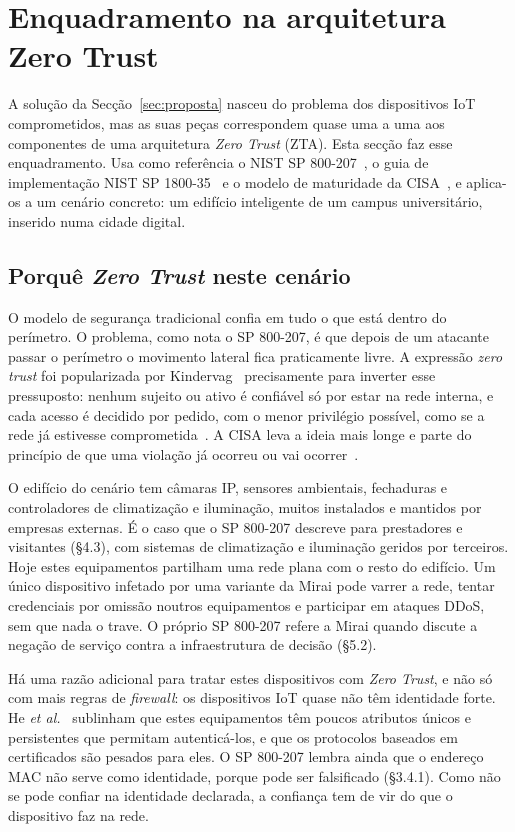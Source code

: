 \documentclass[conference,a4paper]{IEEEtran}
\begin{document}
\section{Enquadramento na arquitetura Zero Trust}\label{sec:zta}
A solução da Secção~\ref{sec:proposta} nasceu do problema dos dispositivos IoT
comprometidos, mas as suas peças correspondem quase uma a uma aos componentes de uma
arquitetura \textit{Zero Trust} (ZTA). Esta secção faz esse enquadramento. Usa como
referência o NIST SP 800-207~\cite{rose2020zta}, o guia de implementação NIST SP
1800-35~\cite{nccoe2025zta} e o modelo de maturidade da CISA~\cite{cisa2023ztmm}, e
aplica-os a um cenário concreto: um edifício inteligente de um campus universitário,
inserido numa cidade digital.

\subsection{Porquê \textit{Zero Trust} neste cenário}
O modelo de segurança tradicional confia em tudo o que está dentro do perímetro. O
problema, como nota o SP 800-207, é que depois de um atacante passar o perímetro o
movimento lateral fica praticamente livre. A expressão \textit{zero trust} foi
popularizada por Kindervag~\cite{kindervag2010zero} precisamente para inverter esse
pressuposto: nenhum sujeito ou ativo é confiável só por estar na rede interna, e cada
acesso é decidido por pedido, com o menor privilégio possível, como se a rede já
estivesse comprometida~\cite{rose2020zta}. A CISA leva a ideia mais longe e parte do
princípio de que uma violação já ocorreu ou vai ocorrer~\cite{cisa2023ztmm}.

O edifício do cenário tem câmaras IP, sensores ambientais, fechaduras e controladores
de climatização e iluminação, muitos instalados e mantidos por empresas externas. É o
caso que o SP 800-207 descreve para prestadores e visitantes (§4.3), com sistemas de
climatização e iluminação geridos por terceiros. Hoje estes equipamentos partilham uma
rede plana com o resto do edifício. Um único dispositivo infetado por uma variante da
Mirai pode varrer a rede, tentar credenciais por omissão noutros equipamentos e
participar em ataques DDoS, sem que nada o trave. O próprio SP 800-207 refere a Mirai
quando discute a negação de serviço contra a infraestrutura de decisão (§5.2).

Há uma razão adicional para tratar estes dispositivos com \textit{Zero Trust}, e não só
com mais regras de \textit{firewall}: os dispositivos IoT quase não têm identidade
forte. He \textit{et al.}~\cite{he2022survey} sublinham que estes equipamentos têm poucos
atributos únicos e persistentes que permitam autenticá-los, e que os protocolos baseados
em certificados são pesados para eles. O SP 800-207 lembra ainda que o endereço MAC não
serve como identidade, porque pode ser falsificado (§3.4.1). Como não se pode confiar na
identidade declarada, a confiança tem de vir do que o dispositivo faz na rede.
\end{document}
